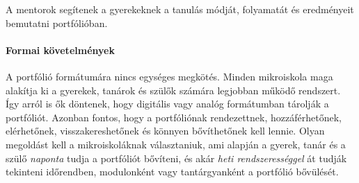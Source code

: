 A mentorok segítenek a gyerekeknek a tanulás módját, folyamatát és eredményeit bemutatni
portfólióban.

\paragraph{Formai követelmények}
A portfólió formátumára nincs egységes megkötés. Minden mikroiskola maga
alakítja ki a gyerekek, tanárok és szülők számára legjobban működő rendszert.
Így arról is ők döntenek, hogy digitális vagy analóg formátumban tárolják a
portfóliót. Azonban fontos, hogy a portfóliónak rendezettnek, hozzáférhetőnek,
elérhetőnek, visszakereshetőnek és könnyen bővíthetőnek kell lennie. Olyan
megoldást kell a mikroiskoláknak választaniuk, ami alapján
a gyerek, tanár és a szülő \emph{naponta} tudja a portfóliót bővíteni, és akár
\emph{heti rendszerességgel} át tudják tekinteni időrendben, modulonként vagy
tantárgyanként a portfólió bővülését.
